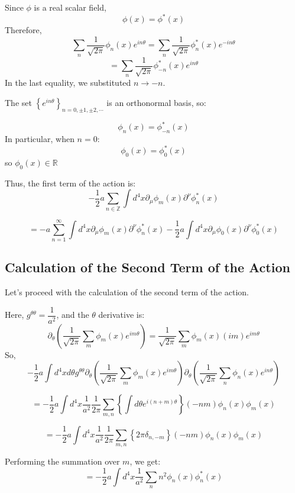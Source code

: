 \documentclass{article}
\begin{document}
Since $\phi$ is a real scalar field,
$$
	\phi(x) = \phi^{*}(x)
$$
Therefore,
$$
	\sum_{n}
	\dfrac{1}{\sqrt{ 2 \pi}}
	\phi_{n}(x)
	e^{i n \theta}
	=
	\sum_{n}
	\dfrac{1}{\sqrt{ 2 \pi}}
	\phi_{n}^{*}(x)
	e^{- i n \theta}
$$
$$
	=
	\sum_{n}
	\dfrac{1}{\sqrt{ 2 \pi}}
	\phi_{-n}^{*}(x)
	e^{i n \theta}
$$
In the last equality, we substituted $n \to -n$.

The set $\left\{ e^{i n \theta} \right\}_{n=0,\pm 1, \pm 2 ,\cdots}$ is an orthonormal basis, so:

$$
	\phi_{n}(x) = \phi^{*}_{-n}(x)
$$
In particular, when $n=0$:
$$
	\phi_{0}(x) = \phi^{*}_{0}(x)
$$
so
$
	\phi_{0}(x)
	\in \mathbb{R}
$

Thus, the first term of the action is:
$$
	- \dfrac{1}{2}
	a
	\sum_{n \in \mathbb{Z}}
	\int d^{4} x
	\partial_{\mu}
	\phi_{m}(x)
	\partial^{\nu}
	\phi_{n}^{*}(x)
$$

$$
	=
	-a
	\sum_{n=1}^{\infty}
	\int d^{4} x
	\partial_{\mu}
	\phi_{m}(x)
	\partial^{\nu}
	\phi_{n}^{*}(x)
	- \dfrac{1}{2}
	a
	\int d^{4} x
	\partial_{\mu}
	\phi_{0}(x)
	\partial^{\nu}
	\phi_{0}^{*}(x)
$$

\subsection{Calculation of the Second Term of the Action}

Let's proceed with the calculation of the second term of the action.

Here, $ g^{\theta \theta} = \dfrac{1}{a^{2}}$, and the $\theta$ derivative is:
$$
	\partial_{\theta}
	\left(
	\dfrac{1}{\sqrt{ 2 \pi}}
	\sum_{m}
	\phi_{m}(x)
	e^{i m \theta}
	\right)
	=
	\dfrac{1}{\sqrt{ 2 \pi}}
	\sum_{m}
	\phi_{m}(x)
	(im)
	e^{i m \theta}
$$
So,
$$
	- \dfrac{1}{2}
	a
	\int d^{4} x d \theta
	g^{\theta \theta}
	\partial_{\theta}
	\left(
	\dfrac{1}{\sqrt{ 2 \pi}}
	\sum_{m}
	\phi_{m}(x)
	e^{i m \theta}
	\right)
	\partial_{\theta}
	\left(
	\dfrac{1}{\sqrt{ 2 \pi}}
	\sum_{n}
	\phi_{n}(x)
	e^{i n \theta}
	\right)
$$

$$
	=
	- \dfrac{1}{2}
	a
	\int d^{4} x
	\dfrac{1}{a^{2}}
	\dfrac{1}{2 \pi}
	\sum_{m,n}
	\left\{
	\int d \theta
	e^{i (n+m) \theta}
	\right\}
	( - n m )
	\phi_{n}(x)
	\phi_{m}(x)
$$

$$
	=
	- \dfrac{1}{2}
	a
	\int d^{4} x
	\dfrac{1}{a^{2}}
	\dfrac{1}{2 \pi}
	\sum_{m,n}
	\left\{
	2 \pi
	\delta_{n,-m}
	\right\}
	( - n m )
	\phi_{n}(x)
	\phi_{m}(x)
$$

Performing the summation over $m$, we get:
$$
	=
	- \dfrac{1}{2}
	a
	\int d^{4} x
	\dfrac{1}{a^{2}}
	\sum_{n}
	n^{2}
	\phi_{n}(x)
	\phi_{n}^{*}(x)
$$
\end{document}
